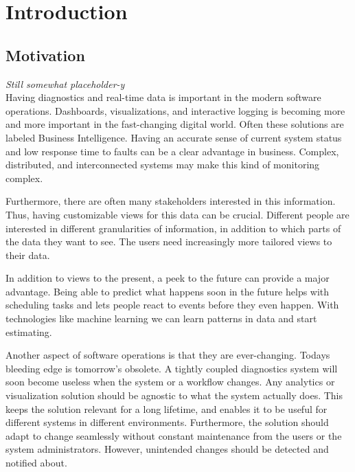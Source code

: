 \documentclass[english,12pt,a4paper,pdftex,sci,utf8]{aaltothesis}
\newcommand{\nyi}[1]{\colorbox{nyibg}{\textcolor{nyitext}{\emph{#1}}}\PackageWarning{NYI}{#1}}
\begin{document}

\section{Introduction}
\thispagestyle{empty}

\subsection{Motivation}
\nyi{Still somewhat placeholder-y} \\

Having diagnostics and real-time data is important in the modern software operations.
Dashboards, visualizations, and interactive logging is becoming more and more important
in the fast-changing digital world. Often these solutions are labeled Business Intelligence.
Having an accurate sense of current system status and low response time to faults can be a clear advantage
in business. Complex, distributed, and interconnected systems may make this kind of monitoring complex.

Furthermore, there are often many stakeholders interested in this information. Thus, having customizable views
for this data can be crucial. Different people are interested in different granularities of information,
in addition to which parts of the data they want to see. The users need increasingly more tailored 
views to their data.

In addition to views to the present, a peek to the future can provide a major advantage.
Being able to predict what happens soon in the future helps with scheduling tasks and lets people react 
to events before they even happen. With technologies like machine learning we can learn patterns in data and 
start estimating.

Another aspect of software operations is that they are ever-changing. 
Todays bleeding edge is tomorrow's obsolete. A tightly coupled diagnostics system
will soon become useless when the system or a workflow changes. Any analytics or visualization solution should
be agnostic to what the system actually does. This keeps the solution relevant for a long lifetime, and enables it
to be useful for different systems in different environments. 
Furthermore, the solution should adapt to change seamlessly without constant maintenance from the users or the system administrators. However, unintended changes should be detected and notified about.
\end{document}
